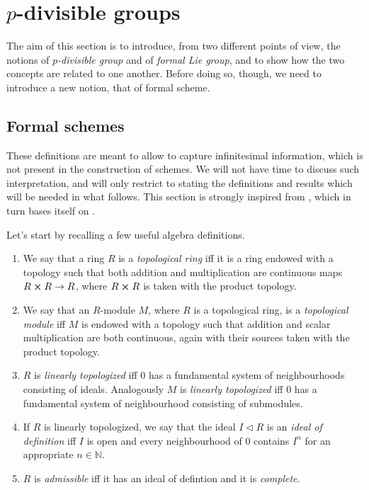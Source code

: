 \documentclass[../Main]{subfiles}
\begin{document}
\section{\texorpdfstring{$p$}{p}-divisible groups}
The aim of this section is to introduce, from two different points of view,
the notions of {\em $p$-divisible group} and of {\em formal Lie group},
and to show how the two concepts are related to one another.
Before doing so, though, we need to introduce a new notion, that
of formal scheme.


\subsection{Formal schemes}
These definitions are meant to allow to capture infinitesimal
information, which is not present in the construction of schemes.
We will not have time to discuss such interpretation, and will
only restrict to stating the definitions and results which will
be needed in what follows.
This section is strongly inspired from 
\cite[\href{https://stacks.math.columbia.edu/tag/0AHY}{Section 0AHY}]{SP},
which in turn bases itself on \cite[Chapter I, \S10]{EGA}.

Let's start by recalling a few useful algebra definitions.


\begin{defn}\leavevmode\vspace{-1\baselineskip}
\begin{enumerate}
\item We say that a ring $R$ is a {\em topological ring} iff it is a ring endowed with a topology
	such that both addition and multiplication are continuous maps
	$R \cross R \to R$, where $R \cross R$ is taken with the product topology.

\item We say that an $R$-module $M$, where $R$ is a topological ring,
	is a {\em topological module} iff $M$ is endowed with a topology such that
	addition and scalar multiplication are both continuous, again with their sources
	taken with the product topology.

\item $R$ is {\em linearly topologized} iff $0$ has a fundamental system
	of neighbourhoods consisting of ideals.
	Analogously $M$ is {\em linearly topologized} iff $0$ has a fundamental
	system of neighbourhood consisting of submodules.

\item If $R$ is linearly topologized, we say that the ideal $I \triangleleft R$
	is an {\em ideal of definition} iff $I$ is open and every neighbourhood
	of $0$ contains $I^n$ for an appropriate $n \in \mathbb{N}$.

\item $R$ is {\em admissible} iff it has an ideal of defintion and it is {\em complete}.
\end{enumerate}
\end{defn}
\end{document}
